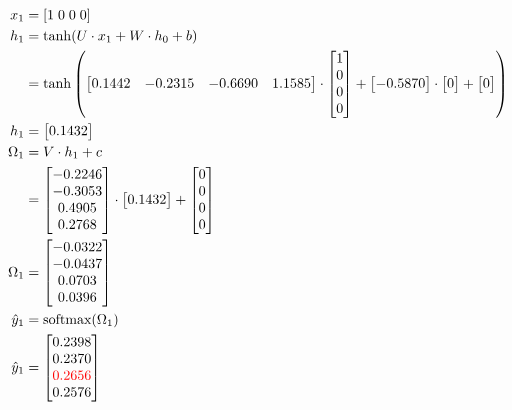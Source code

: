 \documentclass{article}
\begin{document}
\begin{align*}
    x_1 & = [1 \; 0\; 0\; 0] \\
    h_1 & = \tanh(U \cdot x_1 + W \cdot h_0 + b) \\
    & = \tanh\left(\begin{bmatrix} 0.1442 & -0.2315 & -0.6690 & 1.1585 \end{bmatrix} \cdot \begin{bmatrix} 1 \\ 0 \\ 0 \\ 0 \end{bmatrix} + \begin{bmatrix} -0.5870 \end{bmatrix} \cdot \begin{bmatrix} 0 \end{bmatrix} + \begin{bmatrix} 0 \end{bmatrix}\right) \\
    h_1 & = \begin{bmatrix} 0.1432 \end{bmatrix} \\
    \Omega_1 & = V \cdot h_1 + c \\
    & = \begin{bmatrix} -0.2246 \\ -0.3053 \\ 0.4905 \\ 0.2768 \end{bmatrix} \cdot \begin{bmatrix} 0.1432 \end{bmatrix} + \begin{bmatrix} 0 \\ 0 \\ 0 \\ 0 \end{bmatrix} \\
    \Omega_1 & = \begin{bmatrix} -0.0322 \\ -0.0437 \\ 0.0703 \\ 0.0396 \end{bmatrix} \\
    \hat{y}_1 & = \text{softmax}(\Omega_1) \\
    \hat{y}_1 & = \begin{bmatrix} 0.2398 \\ 0.2370 \\ \textcolor{red}{0.2656} \\ 0.2576 \end{bmatrix} 
\end{align*}
\end{document}
